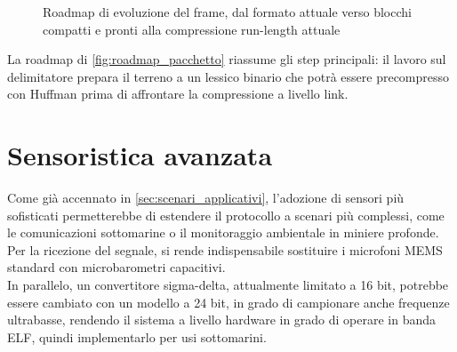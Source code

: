         \begin{figure}[H]
            \centering
            \begin{adjustbox}{width=0.9\linewidth}
        \end{adjustbox}
            \caption{Roadmap di evoluzione del frame, dal formato attuale verso blocchi compatti e pronti alla compressione run-length attuale}
            \label{fig:roadmap_pacchetto}
        \end{figure}
        

La roadmap di \autoref{fig:roadmap_pacchetto} riassume gli step principali: il lavoro sul delimitatore prepara il terreno a un lessico binario
 che potrà essere precompresso con Huffman prima di affrontare la compressione a livello link.\\

\section{Sensoristica avanzata}
\label{sec:sensori_future}
Come già accennato in \autoref{sec:scenari_applicativi}, l'adozione di sensori più sofisticati permetterebbe di estendere il protocollo a scenari più complessi,
 come le comunicazioni sottomarine o il monitoraggio ambientale in miniere profonde.\\
Per la ricezione del segnale, si rende indispensabile sostituire i microfoni MEMS standard con microbarometri capacitivi.\\
 In parallelo, un convertitore sigma-delta, attualmente limitato a 16 bit, potrebbe essere cambiato con un modello a 24 bit, in grado di
 campionare anche frequenze ultrabasse, rendendo il sistema a livello hardware in grado di operare in banda ELF, quindi implementarlo per usi sottomarini.\\ 

